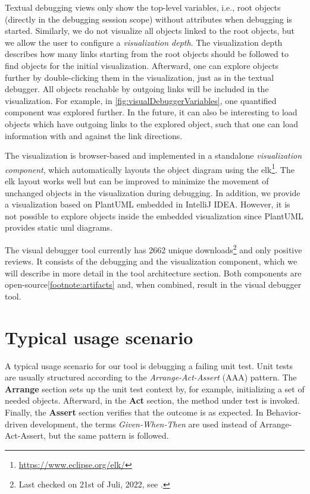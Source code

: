 \documentclass[conference]{IEEEtran}
\newcommand{\intellij}{IntelliJ IDEA}
\begin{document}
Textual debugging views only show the top-level variables, i.e., root objects (directly in the debugging session scope) without attributes when debugging is started.
Similarly, we do not visualize all objects linked to the root objects, but we allow the user to configure a \textit{visualization depth}.
The visualization depth describes how many links starting from the root objects should be followed to find objects for the initial visualization.
Afterward, one can explore objects further by double-clicking them in the visualization, just as in the textual debugger.
All objects reachable by outgoing links will be included in the visualization.
For example, in \cref{fig:visualDebuggerVariables}, one quantified component was explored further.
In the future, it can also be interesting to load objects which have outgoing links to the explored object, such that one can load information with and against the link directions.

The visualization is browser-based and implemented in a standalone \textit{visualization component}, which automatically layouts the object diagram using the \gls*{elk}\footnote{\url{https://www.eclipse.org/elk/}}.
The \gls*{elk} layout works well but can be improved to minimize the movement of unchanged objects in the visualization during debugging.
In addition, we provide a visualization based on PlantUML embedded in \intellij{}.
However, it is not possible to explore objects inside the embedded visualization since PlantUML provides static \gls*{uml} diagrams.

The visual debugger tool currently has 2662 unique downloads\footnote{\label{footnote:pluginStats}Last checked on 21st of Juli, 2022, see \cite{VisualDebuggerIntelliJ}.} and only positive reviews.
It consists of the debugging and the visualization component, which we will describe in more detail in the tool architecture section.
Both components are open-source\cref{footnote:artifacts} and, when combined, result in the visual debugger tool.

\section{Typical usage scenario}  \label{sec:usageScenario}
A typical usage scenario for our tool is debugging a failing unit test.
Unit tests are usually structured according to the \textit{Arrange-Act-Assert} (AAA) pattern.
The \textbf{Arrange} section sets up the unit test context by, for example, initializing a set of needed objects.
Afterward, in the \textbf{Act} section, the method under test is invoked.
Finally, the \textbf{Assert} section verifies that the outcome is as expected.
In Behavior-driven development, the terms \textit{Given-When-Then} are used instead of Arrange-Act-Assert, but the same pattern is followed.
\end{document}
